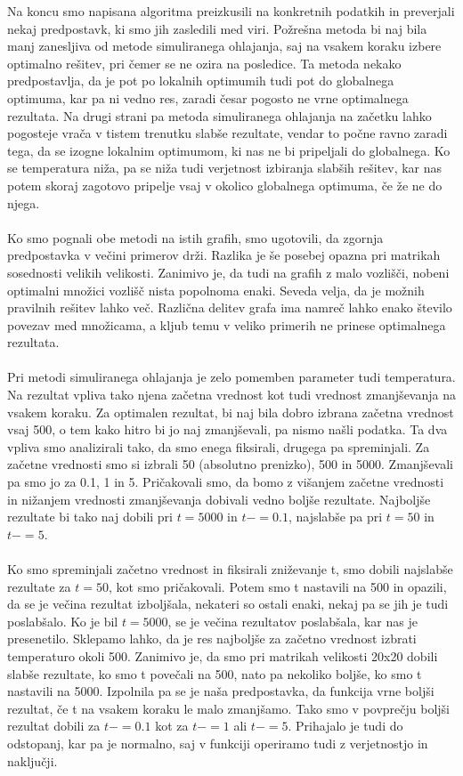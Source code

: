 \documentclass[12pt,a4paper]{amsart}
\theoremstyle{definition} %
\theoremstyle{plain} %
\begin{document}
Na koncu smo napisana algoritma preizkusili na konkretnih podatkih in preverjali nekaj predpostavk, ki smo jih zasledili med viri. Požrešna metoda bi naj bila manj zanesljiva od metode simuliranega ohlajanja, saj na vsakem koraku izbere optimalno rešitev, pri čemer se ne ozira na posledice. Ta metoda nekako predpostavlja, da je pot po lokalnih optimumih tudi pot do globalnega optimuma, kar pa ni vedno res, zaradi česar pogosto ne vrne optimalnega rezultata. Na drugi strani pa metoda simuliranega ohlajanja na začetku lahko pogosteje vrača v tistem trenutku slabše rezultate, vendar to počne ravno zaradi tega, da se izogne lokalnim optimumom, ki nas ne bi pripeljali do globalnega. Ko se temperatura niža, pa se niža tudi verjetnost izbiranja slabših rešitev, kar nas potem skoraj zagotovo pripelje vsaj v okolico globalnega optimuma, če že ne do njega. \\
\\
Ko smo pognali obe metodi na istih grafih, smo ugotovili, da zgornja predpostavka v večini primerov drži. Razlika je še posebej opazna pri matrikah sosednosti  velikih velikosti. Zanimivo je, da tudi na grafih z malo vozlišči, nobeni optimalni množici vozlišč nista popolnoma enaki. Seveda velja, da je možnih pravilnih rešitev lahko več. Različna delitev grafa ima namreč lahko enako število povezav med množicama, a kljub temu v veliko primerih ne prinese optimalnega rezultata.  \\
\\
Pri metodi simuliranega ohlajanja je zelo pomemben parameter tudi temperatura. Na rezultat vpliva tako njena začetna vrednost kot tudi vrednost zmanjševanja na vsakem koraku. Za optimalen rezultat, bi naj bila dobro izbrana začetna vrednost vsaj 500, o tem kako hitro bi jo naj zmanjševali, pa nismo našli podatka. Ta dva vpliva smo analizirali tako, da smo enega fiksirali, drugega pa spreminjali. Za začetne vrednosti smo si izbrali 50 (absolutno prenizko), 500 in 5000. Zmanjševali pa smo jo za 0.1, 1 in 5. Pričakovali smo, da bomo z višanjem začetne vrednosti in nižanjem vrednosti zmanjševanja dobivali vedno boljše rezultate. Najboljše rezultate bi tako naj dobili pri $t=5000$ in $t -=0.1$, najslabše pa pri $t=50$ in $t -=5$. \\
\\
Ko smo spreminjali začetno vrednost in fiksirali zniževanje t, smo dobili najslabše rezultate za $t=50$, kot smo pričakovali. Potem smo t nastavili na 500 in opazili, da se je večina rezultat izboljšala, nekateri so ostali enaki, nekaj pa se jih je tudi poslabšalo. Ko je bil $t=5000$, se je večina rezultatov poslabšala, kar nas je presenetilo. Sklepamo lahko, da je res najboljše za začetno vrednost izbrati temperaturo okoli 500. Zanimivo je, da smo pri matrikah velikosti 20x20 dobili slabše rezultate, ko smo t povečali na 500, nato pa nekoliko boljše, ko smo t nastavili na 5000. Izpolnila pa se je naša predpostavka, da funkcija vrne boljši rezultat, če t na vsakem koraku le malo zmanjšamo. Tako smo v povprečju boljši rezultat dobili za $t -=0.1$ kot za $t -=1$ ali $t -=5$. Prihajalo je tudi do odstopanj, kar pa je normalno, saj v funkciji operiramo tudi z verjetnostjo in naključji. \\
\end{document}
